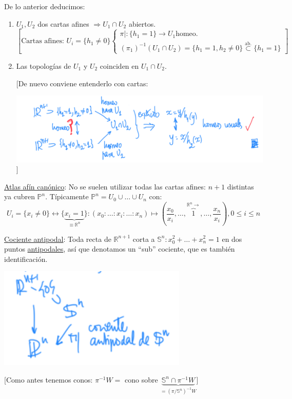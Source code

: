 \begin{obs}
De lo anterior deducimos:
\begin{enumerate}
    \item $U_1, U_2$ dos cartas afines $\Rightarrow U_1 \cap U_2$ abiertos.
    \[
    \left[ \text{Cartas afines: } U_i = \{h_1 \neq 0\} \begin{cases}
        \pi|: \{h_1 = 1\} \rightarrow U_1 \text{homeo.}\\
        \left( \pi_1 \right)^{-1}\left( U_1 \cap U_2 \right) = \{h_1 = 1, h_2 \neq 0\} \stackrel{\text{ab.}}{\subset} \{h_1 = 1\}  
    \end{cases} \right] 
    \]
    \item Las topologías de $U_1$ y $U_2$ coinciden en $U_1 \cap U_2$.

    [De nuevo conviene entenderlo con cartas:
    \begin{center}
        \includegraphics[scale=0.3]{images/obs_cartas_afines} ]
    \end{center}
\end{enumerate}
\end{obs}

\underline{Atlas afín canónico}: No se suelen utilizar todas las cartas afines: $n + 1$ distintas ya cubren $\mathbb{P}^{n}$. Típicamente $\mathbb{P}^{n} = U_0 \cup \ldots \cup U_n$ con:
\[
U_i = \{x_i \neq 0\} \leftrightarrow \{\underbrace{x_i = 1}_{\equiv \mathbb{R}^n}\}: \left( x_0 : \ldots : x_i : \ldots : x_n \right) \mapsto \left( \frac{x_0}{x_i}, \ldots, \overbrace{1}^{\mathbb{R}^n \rightarrow}, \ldots, \frac{x_n}{x_i} \right), 0 \le i \le n
\]

\underline{Cociente antipodal}: Toda recta de $\mathbb{R}^{n + 1}$ corta a $\mathbb{S}^{n}: x_0^2 + \ldots + x_n^2 = 1$ en dos puntos \underline{antipodales}, así que denotamos un ``sub'' cociente, que es también identificación.
\begin{center}
    \includegraphics[scale=0.3]{images/cociente_antipodal} 

    [Como antes tenemos conos: $\pi^{-1}W = $ cono sobre $\underbrace{\mathbb{S}^n \cap \pi^{-1}W}_{= \left( \pi / \mathbb{S}^n \right)^{-1} W}$]
\end{center}

